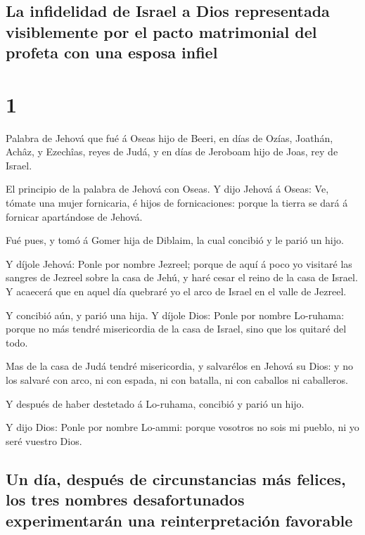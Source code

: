 \hypertarget{la-infidelidad-de-israel-a-dios-representada-visiblemente-por-el-pacto-matrimonial-del-profeta-con-una-esposa-infiel}{%
\subsection{La infidelidad de Israel a Dios representada visiblemente
por el pacto matrimonial del profeta con una esposa
infiel}\label{la-infidelidad-de-israel-a-dios-representada-visiblemente-por-el-pacto-matrimonial-del-profeta-con-una-esposa-infiel}}

\hypertarget{section}{%
\section{1}\label{section}}

 Palabra de Jehová que fué á Oseas hijo de Beeri, en días
de Ozías, Joathán, Achâz, y Ezechîas, reyes de Judá, y en días de
Jeroboam hijo de Joas, rey de Israel.

 El principio de la palabra de Jehová con Oseas. Y dijo
Jehová á Oseas: Ve, tómate una mujer fornicaria, é hijos de
fornicaciones: porque la tierra se dará á fornicar apartándose de
Jehová.

 Fué pues, y tomó á Gomer hija de Diblaim, la cual
concibió y le parió un hijo.

 Y díjole Jehová: Ponle por nombre Jezreel; porque de aquí
á poco yo visitaré las sangres de Jezreel sobre la casa de Jehú, y haré
cesar el reino de la casa de Israel.  Y acaecerá que en
aquel día quebraré yo el arco de Israel en el valle de Jezreel.

 Y concibió aún, y parió una hija. Y díjole Dios: Ponle
por nombre Lo-ruhama: porque no más tendré misericordia de la casa de
Israel, sino que los quitaré del todo.

 Mas de la casa de Judá tendré misericordia, y salvarélos
en Jehová su Dios: y no los salvaré con arco, ni con espada, ni con
batalla, ni con caballos ni caballeros.

 Y después de haber destetado á Lo-ruhama, concibió y
parió un hijo.

 Y dijo Dios: Ponle por nombre Lo-ammi: porque vosotros no
sois mi pueblo, ni yo seré vuestro Dios.

\hypertarget{un-duxeda-despuuxe9s-de-circunstancias-muxe1s-felices-los-tres-nombres-desafortunados-experimentaruxe1n-una-reinterpretaciuxf3n-favorable}{%
\subsection{Un día, después de circunstancias más felices, los tres
nombres desafortunados experimentarán una reinterpretación
favorable}\label{un-duxeda-despuuxe9s-de-circunstancias-muxe1s-felices-los-tres-nombres-desafortunados-experimentaruxe1n-una-reinterpretaciuxf3n-favorable}}

